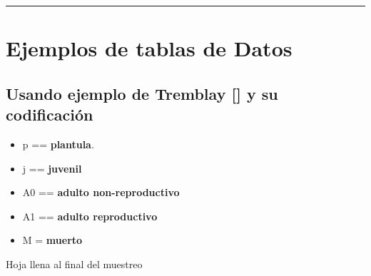 \documentclass[
]{book}
\providecommand{\tightlist}{%
  \setlength{\itemsep}{0pt}\setlength{\parskip}{0pt}}
\theoremstyle{definition}
\theoremstyle{definition}
\theoremstyle{definition}
\theoremstyle{definition}
\theoremstyle{remark}
\begin{document}
\begin{center}\rule{0.5\linewidth}{0.5pt}\end{center}

\section{Ejemplos de tablas de Datos}\label{ejemplos-de-tablas-de-datos}

\subsection{Usando ejemplo de Tremblay {[}{]} y su codificación}\label{usando-ejemplo-de-tremblay-y-su-codificaciuxf3n}

\begin{itemize}
\tightlist
\item
  p == \textbf{plantula}.
\item
  j == \textbf{juvenil}
\item
  A0 == \textbf{adulto non-reproductivo}
\item
  A1 == \textbf{adulto reproductivo}
\item
  M = \textbf{muerto}
\end{itemize}

Hoja llena al final del muestreo
\end{document}
